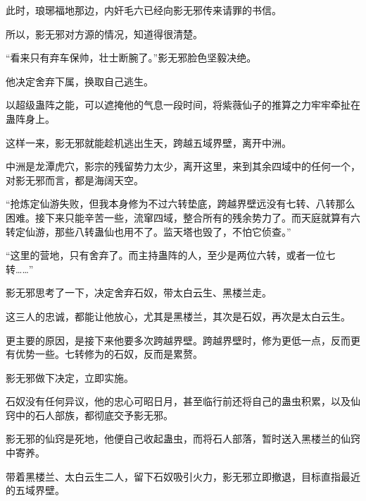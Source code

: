 \begin{this_body}
此时，琅琊福地那边，内奸毛六已经向影无邪传来请罪的书信。

所以，影无邪对方源的情况，知道得很清楚。

“看来只有弃车保帅，壮士断腕了。”影无邪脸色坚毅决绝。

他决定舍弃下属，换取自己逃生。

以超级蛊阵之能，可以遮掩他的气息一段时间，将紫薇仙子的推算之力牢牢牵扯在蛊阵身上。

这样一来，影无邪就能趁机逃出生天，跨越五域界壁，离开中洲。

中洲是龙潭虎穴，影宗的残留势力太少，离开这里，来到其余四域中的任何一个，对影无邪而言，都是海阔天空。

“抢炼定仙游失败，但我本身修为不过六转垫底，跨越界壁远没有七转、八转那么困难。接下来只能辛苦一些，流窜四域，整合所有的残余势力了。而天庭就算有六转定仙游，那些八转蛊仙也用不了。监天塔也毁了，不怕它侦查。”

“这里的营地，只有舍弃了。而主持蛊阵的人，至少是两位六转，或者一位七转……”

影无邪思考了一下，决定舍弃石奴，带太白云生、黑楼兰走。

这三人的忠诚，都能让他放心，尤其是黑楼兰，其次是石奴，再次是太白云生。

更主要的原因，是接下来他要多次跨越界壁。跨越界壁时，修为更低一点，反而更有优势一些。七转修为的石奴，反而是累赘。

影无邪做下决定，立即实施。

石奴没有任何异议，他的忠心可昭日月，甚至临行前还将自己的蛊虫积累，以及仙窍中的石人部族，都彻底交予影无邪。

影无邪的仙窍是死地，他便自己收起蛊虫，而将石人部落，暂时送入黑楼兰的仙窍中寄养。

带着黑楼兰、太白云生二人，留下石奴吸引火力，影无邪立即撤退，目标直指最近的五域界壁。

\end{this_body}

